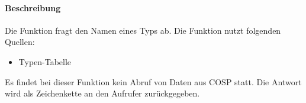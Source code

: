 \paragraph{Beschreibung} Die Funktion fragt den Namen eines Typs ab. Die Funktion nutzt folgenden Quellen:
\begin{itemize}
	\item Typen-Tabelle
\end{itemize}
Es findet bei dieser Funktion kein Abruf von Daten aus {\glqq COSP\grqq} statt. Die Antwort wird als Zeichenkette an den Aufrufer zurückgegeben.

